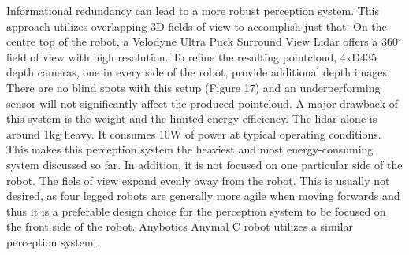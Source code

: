 \documentclass{article}
\begin{document}
\begin{enumerate}
Informational redundancy can lead to a more robust perception system. This approach utilizes overlapping 3D fields of view to accomplish just that. On the centre top of the robot, a Velodyne Ultra Puck Surround View Lidar offers a 360$^{\circ}$ field of view with high resolution. To refine the resulting pointcloud, 4xD435 depth cameras, one in every side of the robot, provide additional depth images. There are no blind spots with this setup (Figure 17) and an underperforming sensor will not significantly affect the produced pointcloud.
A major drawback of this system is the weight and the limited energy efficiency. The lidar alone is around 1kg heavy. It consumes 10W of power at typical operating conditions. This makes this perception system the heaviest and most energy-consuming system discussed so far. In addition, it is not focused on one particular side of the robot. The fiels of view expand evenly away from the robot. This is usually not desired, as four legged robots are generally more agile when moving forwards and thus it is a preferable design choice for the perception system to be focused on the front side of the robot. Anybotics Anymal C robot utilizes a similar perception system \cite{noauthor_anymal_nodate}.


\end{enumerate}
\end{document}
